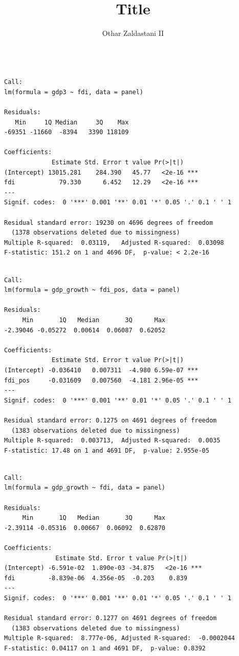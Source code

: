 \documentclass[
  letterpaper,
  DIV=11,
  numbers=noendperiod]{scrartcl}
\title{Title}
\author{Othar Zaldastani II}
\date{}
\begin{document}
\maketitle


\begin{verbatim}

Call:
lm(formula = gdp3 ~ fdi, data = panel)

Residuals:
   Min     1Q Median     3Q    Max 
-69351 -11660  -8394   3390 118109 

Coefficients:
             Estimate Std. Error t value Pr(>|t|)    
(Intercept) 13015.281    284.390   45.77   <2e-16 ***
fdi            79.330      6.452   12.29   <2e-16 ***
---
Signif. codes:  0 '***' 0.001 '**' 0.01 '*' 0.05 '.' 0.1 ' ' 1

Residual standard error: 19230 on 4696 degrees of freedom
  (1378 observations deleted due to missingness)
Multiple R-squared:  0.03119,   Adjusted R-squared:  0.03098 
F-statistic: 151.2 on 1 and 4696 DF,  p-value: < 2.2e-16
\end{verbatim}

\begin{verbatim}

Call:
lm(formula = gdp_growth ~ fdi_pos, data = panel)

Residuals:
     Min       1Q   Median       3Q      Max 
-2.39046 -0.05272  0.00614  0.06087  0.62052 

Coefficients:
             Estimate Std. Error t value Pr(>|t|)    
(Intercept) -0.036410   0.007311  -4.980 6.59e-07 ***
fdi_pos     -0.031609   0.007560  -4.181 2.96e-05 ***
---
Signif. codes:  0 '***' 0.001 '**' 0.01 '*' 0.05 '.' 0.1 ' ' 1

Residual standard error: 0.1275 on 4691 degrees of freedom
  (1383 observations deleted due to missingness)
Multiple R-squared:  0.003713,  Adjusted R-squared:  0.0035 
F-statistic: 17.48 on 1 and 4691 DF,  p-value: 2.955e-05
\end{verbatim}

\begin{verbatim}

Call:
lm(formula = gdp_growth ~ fdi, data = panel)

Residuals:
     Min       1Q   Median       3Q      Max 
-2.39114 -0.05316  0.00667  0.06092  0.62870 

Coefficients:
              Estimate Std. Error t value Pr(>|t|)    
(Intercept) -6.591e-02  1.890e-03 -34.875   <2e-16 ***
fdi         -8.839e-06  4.356e-05  -0.203    0.839    
---
Signif. codes:  0 '***' 0.001 '**' 0.01 '*' 0.05 '.' 0.1 ' ' 1

Residual standard error: 0.1277 on 4691 degrees of freedom
  (1383 observations deleted due to missingness)
Multiple R-squared:  8.777e-06, Adjusted R-squared:  -0.0002044 
F-statistic: 0.04117 on 1 and 4691 DF,  p-value: 0.8392
\end{verbatim}
\end{document}
